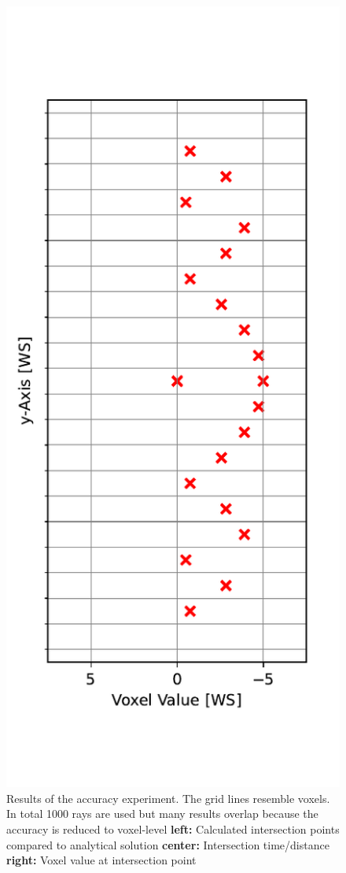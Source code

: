 \begin{figure}[h]
  \includegraphics[width=\linewidth]{res/intersection_values.pdf}
  \endminipage
  \caption{ Results of the accuracy experiment. The grid lines resemble voxels. In total 1000 rays are used but many results overlap because the accuracy is reduced to voxel-level
    \textbf{left:} Calculated intersection points compared to analytical solution
    \textbf{center:} Intersection time/distance
    \textbf{right:} Voxel value at intersection point
  }
  \label{fig:results_accuracy}
\end{figure}





\nocite{openvdb}
\nocite{nanovdb}

